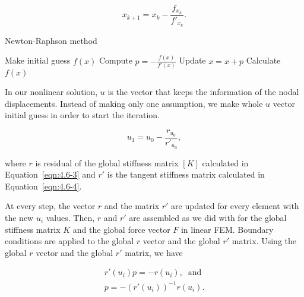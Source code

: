 \begin{equation}
x_{k+1} = x_{k} - \frac{f_{x_{k}}}{f'_{x_{k}}}.
\label{eqn:4.7-1}
\end{equation}

\begin{algorithm}
\caption{Newton-Raphson method}
\label{alg:newton-raphson}
{
\fontsize{10}{10}\selectfont
\begin{algorithmic}[l]
\STATE Make initial guess $f(x)$          			\vspace*{1.0ex}
             			\vspace*{1.0ex}
     \STATE Compute  $p = -\frac{f(x)}{f'(x)}$      \vspace*{1.0ex}
     \STATE Update $x = x + p$            			\vspace*{1.0ex}
     \STATE Calculate $f(x)$              			\vspace*{1.0ex}
\ENDWHILE

\end{algorithmic}
}
\end{algorithm}

In our nonlinear solution, $u$ is the vector that keeps the information of the nodal displacements. Instead of making only one assumption, we make whole $u$ vector initial guess in order to start the iteration.

\begin{equation}
u_{1} = u_{0} - \frac{r_{u_{0}}}{r'_{u_{0}}},
\label{eqn:4.7}
\end{equation}

\noindent where $r$ is residual of the global stiffness matrix $[K]$ calculated in Equation~\ref{eqn:4.6-3} and $r'$ is the tangent stiffness matrix calculated in Equation~\ref{eqn:4.6-4}.

At every step, the vector $r$ and the matrix $r'$ are updated for every element with the new $u_{i}$ values. Then, $r$ and $r'$ are assembled as we did with for the global stiffness matrix $K$ and the global force vector $F$ in linear FEM. Boundary conditions are applied to the global $r$ vector and the global $r'$ matrix. Using the global $r$ vector and the global $r'$ matrix, we have

\begin{equation}
\begin{array}{l}
{r'(u_{i})}p = -{r(u_{i})},\;\; \text{and}\\
p = -(r'(u_{i}))^{-1}r(u_{i}).
\end{array}
\label{eqn:4.9}
\end{equation}

